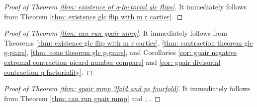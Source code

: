 \documentclass[11pt]{amsart}
\numberwithin{equation}{section}
\newcommand{\Mm}{{\bf{M}}}
\newcommand{\Qq}{\mathbb{Q}}
\newtheorem{lem}[thm]{Lemma}
\theoremstyle{definition}
\theoremstyle{definition}
\theoremstyle{definition}
\begin{document}
\begin{proof}[Proof of Theorem \ref{thm: existence of q-factorial glc flips}] It immediately follows from Theorem  \ref{thm: existence glc flip with m r cartier}.
\end{proof}

\begin{proof}[Proof of Theorem \ref{thm: can run gpair mmp}]
It immediately follows from Theorems \ref{thm: existence glc flip with m r cartier}, \ref{thm: contraction theorem glc g-pairs}, \ref{thm: cone theorem glc g-pairs}, and Corollaries \ref{cor: gpair negative extremal contraction picard number compare} and \ref{cor: gpair divisorial contraction q factoriality}. 
\end{proof}

\begin{proof}[Proof of Theorem \ref{thm: gpair mmp 3fold and pe fourfold}]
It immediately follows from Theorem \ref{thm: can run gpair mmp} and \cite[Corollary 1]{HM20}, \cite[Theorems 1.2,1.3]{CT20}.
\end{proof}








\begin{comment}
\begin{lem}[cf. {\cite[Lemma 3.17]{HL18}}, Lemma {\ref{lem: trivial mmp under perturbation}}]
Let $(X,B+A,\Mm)/U$ be a $\Qq$-factorial NQC glc g-pair, $(X,B,\Mm)$ is glc, and $K_X+B+\Mm_X$ is nef$/U$. Then there exists a positive real number $t_0$, such that for any $t\in (0,t_0]$, any partial $(K_X+B+tA+\Mm_X)$-MMP$/U$ is $(K_X+B+\Mm_X)$-trivial. Note that $A$ is not necessarily effective.
\end{lem}
\begin{proof}
By Theorem \ref{thm: shokurov polytope gpair}, we may write $(K_X+B+\Mm_X)=\sum_{i=1}^ka_i(K_X+B^i+\Mm^i_X)$, where
\begin{itemize}
    \item each $a_i\in (0,1]$ and $\sum_{i=1}^ka_i=1$, and
    \item each $(X,B^i,\Mm^i)/U$ is a glc $\Qq$-g-pair.
\end{itemize}
Let $m$ be a positive integer such that $m(K_X+B^i+\Mm^i_X)$ is Cartier or any $i$. By Lemma \ref{lem: glc pair length of positive extremal ray}, we may let $\alpha$ be a positive real number, such that for any ray in $\overline{NE}(X/U)$ generated by a curve $C$, if $(K_X+B+\Mm_X)\cdot C>0$, then $(K_X+B+\Mm_X)\cdot C\geq\alpha$. Let $t_0:=\frac{1}{2}\cdot\frac{\alpha}{2\dim X+\alpha}$. Then for any $t\in (0,t_0]$ and any $(K_X+B+tA+\Mm_X)$-negative extremal ray $R$ in $\overline{NE}(X/U)$, by Theorem \ref{thm: cone and contraction theorem glc pair}(2), there exists a curve $C$ which generates $R$, such that $(K_X+B+A+\Mm_X)\cdot C\geq -2\dim X$. Thus
$$0>(1-t)(K_X+B+\Mm_X)\cdot C+t(K_X+B+A+\Mm_X)\cdot C\geq -2t\dim X+(1-t)(K_X+B+\Mm_X)\cdot C,$$
so
$$(K_X+B+\Mm_X)\cdot C\leq\frac{2t\dim X}{1-t}\leq\frac{2t_0\dim X}{1-t_0}<\alpha,$$
hence $(K_X+B+\Mm_X)\cdot C=0$.
\end{proof}
\end{comment}
\end{document}
